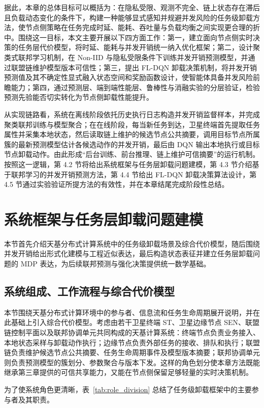 据此，本章的总体目标可以概括为：在隐私受限、观测不完全、链上状态存在滞后且负载动态变化的条件下，构建一种能够显式感知并规避并发风险的任务级卸载方法，使节点侧策略在任务完成时延、能耗、吞吐量与负载均衡之间实现更合理的折中。围绕这一目标，本文主要开展以下四方面工作：第一，建立面向节点侧实时决策的任务层代价模型，将时延、能耗与并发开销统一纳入优化框架；第二，设计聚类式联邦学习机制，在 Non-IID 与隐私受限条件下训练并发开销预测模型，并通过联盟链维护模型版本可信性；第三，提出 FL-DQN 卸载决策机制，将并发开销预测值及其不确定性显式融入状态空间和奖励函数设计，使智能体具备并发风险前瞻能力；第四，通过预测层、端到端性能层、鲁棒性与消融实验的分层验证，检验预测先验能否切实转化为节点侧卸载性能提升。

从实现链路看，系统在离线阶段依托历史执行日志构造并发开销监督样本，并完成聚类联邦训练与模型聚合；在在线阶段，每当新任务到达，卫星终端首先提取任务属性并采集本地状态，然后读取链上维护的候选节点公共摘要，调用目标节点所属簇的最新预测模型估计各候选动作的并发开销，最后由 DQN 输出本地执行或目标节点卸载动作。由此形成“后台训练、前台推理、链上维护可信摘要”的运行机制。按照这一逻辑，第 4.2 节将给出系统框架与任务层卸载问题建模，第 4.3 节介绍基于联邦学习的并发开销预测方法，第 4.4 节给出 FL-DQN 卸载决策算法设计，第 4.5 节通过实验验证所提方法的有效性，并在本章结尾完成阶段性总结。

\section{系统框架与任务层卸载问题建模}
\label{sec:modeling}
本节首先介绍天基分布式计算系统中的任务级卸载场景及综合代价模型，随后围绕并发开销给出形式化建模与工程近似表达，最后构造状态表征并建立任务层卸载问题的 MDP 表达，为后续联邦预测与强化决策提供统一数学基础。


\subsection{系统组成、工作流程与综合代价模型}

本节围绕天基分布式计算环境中的参与者、信息流和任务生命周期展开说明，并在此基础上引入综合代价模型。考虑由若干卫星终端 ST、卫星边缘节点 SEN、联盟链控制平面以及联邦协调单元共同构成的天基计算系统：终端节点负责业务接入、本地状态采样与卸载动作执行；边缘节点负责外部任务的接收、排队和执行；联盟链负责维护候选节点公共摘要、任务生命周期事件及模型版本摘要；联邦协调单元则负责预测模型的簇划分、参数聚合与版本下发。这样的角色划分使本章方法既能继承第三章提供的可信共享能力，又能在节点侧保留足够轻量的实时决策机制。

为了使系统角色更清晰，表~\ref{tab:role_division} 总结了任务级卸载框架中的主要参与者及其职责。

